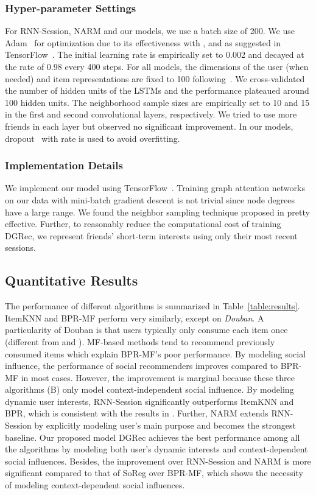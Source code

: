 \documentclass[sigconf]{acmart}
\begin{document}
\subsubsection{Hyper-parameter Settings}
For RNN-Session, NARM and our models, we use a batch size of 200. We use Adam~\cite{kingma2014adam} for optimization due to its effectiveness with ,  and  as suggested in TensorFlow~\cite{tensorflow2015-whitepaper}. The initial learning rate is empirically set to 0.002 and decayed at the rate of 0.98 every 400 steps. For all models, the dimensions of the user (when needed) and item representations are fixed to 100 following~\citet{hidasi2016session}. We cross-validated the number of hidden units of the LSTMs and the performance plateaued around 100 hidden units.
The neighborhood sample sizes are empirically set to 10 and 15 in the first and second convolutional layers, respectively. We tried to use more friends in each layer but observed no significant improvement. 
In our models, dropout~\cite{srivastava2014dropout} with rate  is used to avoid overfitting.


\subsubsection{Implementation Details} We implement our model using TensorFlow~\cite{tensorflow2015-whitepaper}. Training graph attention networks on our data with mini-batch gradient descent is not trivial since node degrees have a large range. We found the neighbor sampling technique proposed in \cite{hamilton2017inductive} pretty effective. 
Further, to reasonably reduce the computational cost of training \gls{DGRec}, we represent friends' short-term interests using only their most recent sessions.

\subsection{Quantitative Results}\label{sec:quantitative_results}
The performance of different algorithms is summarized in Table~\ref{table:results}. ItemKNN and BPR-MF
perform very similarly, except on \textit{Douban}. 
A particularity of Douban is that users typically only consume each item once (different from  and ). MF-based methods tend to recommend previously consumed items which explain BPR-MF's poor performance.
By modeling social influence, the performance of social recommenders improves compared to BPR-MF in most cases. However, the improvement is marginal because these three algorithms (B) only model context-independent social influence. By modeling dynamic user interests, RNN-Session significantly outperforms ItemKNN and BPR, which is consistent with the results in \citet{hidasi2016session}.
Further, NARM extends RNN-Session by explicitly modeling user's main purpose and becomes the strongest baseline. Our proposed model \gls{DGRec} achieves the best performance among all the algorithms by modeling both user's dynamic interests and context-dependent social influences. Besides, the improvement over RNN-Session and NARM is more significant compared to that of SoReg over BPR-MF, which shows the necessity of modeling context-dependent social influences.
\end{document}
